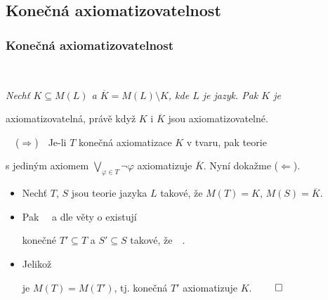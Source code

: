 \smallskip
{}


\subsection{Konečná axiomatizovatelnost}\todo

\subsubsection*{Konečná axiomatizovatelnost}
    
    {\bf {}}\ \ {\it Nechť $K\subseteq M(L)$ a $\overline{K}=M(L)\setminus K$, kde $L$ je jazyk. Pak $K$ je 
    \smallskip
    
    axiomatizovatelná, právě když $K$ i $\overline{K}$ jsou axiomatizovatelné.}
    \smallskip
    \medskip
    
    {\it {}}\ \ ($\Rightarrow$)\ \ Je-li $T$ konečná axiomatizace $K$ v  tvaru, pak teorie
    \smallskip
    
    s jediným axiomem $\bigvee_{\varphi\in T}\neg\varphi$ axiomatizuje $\overline{K}$. Nyní dokažme ($\Leftarrow$).
    \vspace{0.5mm}
    
    \begin{itemize}
    \item Nechť $T$, $S$ jsou teorie jazyka $L$ takové, že $M(T)=K$, $M(S)=\overline{K}$.
    \smallskip
    
    \item Pak \ \ a dle věty o  existují
    \smallskip
    
    konečné $T'\subseteq T$ a $S'\subseteq S$ takové, že\ \ .
    \smallskip
    
    \item Jelikož
    
    \vspace{-4mm}
    je $M(T)=M(T')$, tj. konečná $T'$ axiomatizuje $K$. $\qed$
    \end{itemize}
    
